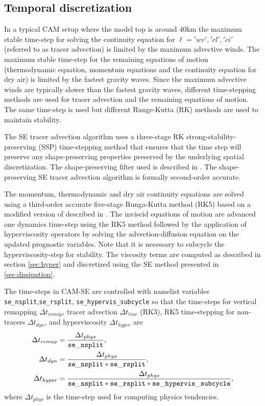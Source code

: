 \documentclass{agujournal}
\begin{document}
{\subsection{Temporal discretization}
In a typical CAM setup where the model top is around 40km the maximum stable time-step for solving the continuity equation for $\ell='wv','cl','ci'$ (referred to as tracer advection) is limited by the maximum advective winds. The maximum stable time-step for the remaining equations of motion (thermodynamic equation, momentum equations and the continuity equation for dry air) is limited by the fastest gravity waves.  Since the maximum advective winds are typically slower than the fastest gravity waves, different time-stepping methods are used for tracer advection and the remaining equations of motion. The same time-step is used but different Runge-Kutta (RK) methods are used to maintain stability. 

The SE tracer advection algorithm uses a three-stage RK strong-stability-preserving (SSP) time-stepping method that ensures that the time step will preserve any shape-preserving properties preserved by the underlying spatial discretization\citep{SR2002SIAM}. The shape-preserving filter used is described in \citet{GTS2014JCP}. The shape-preserving SE tracer advection algorithm is formally second-order accurate.{\color{red}{[limiter applied in last RK step?]}}

The momentum, thermodynamic and dry air continuity equations are solved using a third-order accurate five-stage Runga-Kutta method (RK5) based on a modified version of \cite{KG1984MCSb,KG1984MCS} described in \cite{GU2016GMD}. The inviscid equations of motion are advanced one dynamics time-step using the RK5 method followed by the application of hyperviscosity operators by solving the advection-diffusion equation on the updated prognostic variables. Note that it is necessary to subcycle the hyperviscosity-step for stability. The viscosity terms are computed as described in section \ref{sec:hyper} and discretized using the SE method presented in \ref{sec:dissipation}.

{\color{red}{[How is tracer advection coupled to dry air continuity equation??]}} 

The time-steps in CAM-SE are controlled with namelist variables {\tt{se\_nsplit}},{\tt{se\_rsplit}},
{\tt{se\_hypervis\_subcycle}}  so that the time-steps for vertical remapping $\Delta t_{remap}$, tracer advection $\Delta t_{trac}$ (RK3), RK5 time-stepping for non-tracers $\Delta t_{dyn}$, and hyperviscosity $\Delta t_{hyper}$ are
\begin{align}
\Delta t_{remap}&=\frac{\Delta t_{phys}}{\tt{se\_nsplit}},\\
\Delta t_{dyn}&=\frac{\Delta t_{phys}}{\tt{se\_nsplit*se\_rsplit}},\\
\Delta t_{hyper}&=\frac{\Delta t_{phys}}{\tt{se\_nsplit*se\_rsplit*se\_hypervis\_subcycle}},\\
\end{align}
where $\Delta t_{phys}$ is the time-step used for computing physics tendencies.
%
}
\end{document}
